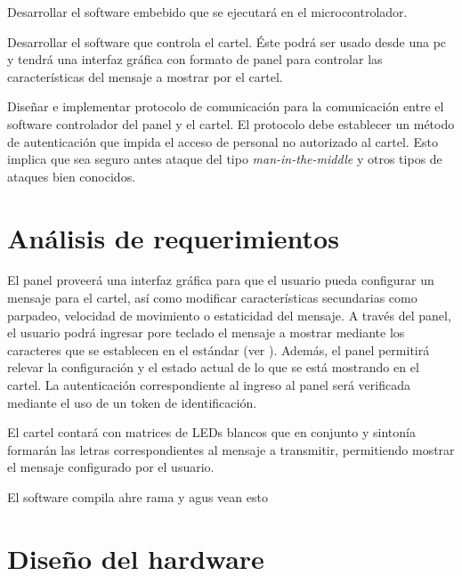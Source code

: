 Desarrollar el software embebido que se ejecutará en el microcontrolador.

Desarrollar el software que controla el cartel. Éste podrá ser usado desde una pc y tendrá una interfaz gráfica con formato de panel para controlar las características del mensaje a mostrar por el cartel.

Diseñar e implementar protocolo de comunicación para la comunicación entre el software controlador del panel y el cartel. El protocolo debe establecer un método de autenticación que impida el acceso de personal no autorizado al cartel. Esto implica que sea seguro antes ataque del tipo \emph{man-in-the-middle} y otros tipos de ataques bien conocidos.

\section{Análisis de requerimientos}



El panel proveerá una interfaz gráfica para que el usuario pueda configurar un mensaje para el cartel, así como modificar características secundarias como parpadeo, velocidad de movimiento o estaticidad del mensaje. A través del panel, el usuario podrá ingresar pore teclado el mensaje a mostrar mediante los caracteres que se establecen en el estándar (ver \cite{CodifChar}). Además, el panel permitirá relevar la configuración y el estado actual de lo que se está mostrando en el cartel. La autenticación correspondiente al ingreso al panel será verificada mediante el uso de un token de identificación.

El cartel contará con matrices de LEDs blancos que en conjunto y sintonía formarán las letras correspondientes al mensaje a transmitir, permitiendo mostrar el mensaje configurado por el usuario. 

El software compila ahre rama y agus vean esto


\section{Diseño del hardware}
